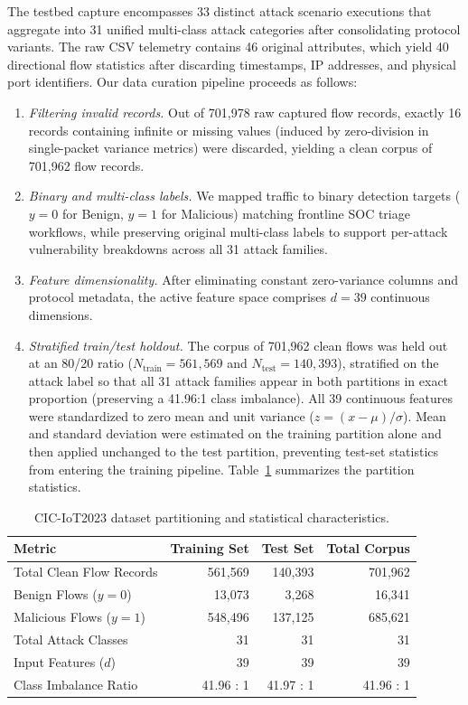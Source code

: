 \documentclass[iicol,pdflatex,sn-mathphys-num]{sn-jnl}
\begin{document}
The testbed capture encompasses 33 distinct attack scenario executions that aggregate into 31 unified multi-class attack categories after consolidating protocol variants. The raw CSV telemetry contains 46 original attributes, which yield 40 directional flow statistics after discarding timestamps, IP addresses, and physical port identifiers. Our data curation pipeline proceeds as follows:
\begin{enumerate}
    \item \textit{Filtering invalid records.} Out of 701,978 raw captured flow records, exactly 16 records containing infinite or missing values (induced by zero-division in single-packet variance metrics) were discarded, yielding a clean corpus of 701,962 flow records.
    \item \textit{Binary and multi-class labels.} We mapped traffic to binary detection targets ($y=0$ for Benign, $y=1$ for Malicious) matching frontline SOC triage workflows, while preserving original multi-class labels to support per-attack vulnerability breakdowns across all 31 attack families.
    \item \textit{Feature dimensionality.} After eliminating constant zero-variance columns and protocol metadata, the active feature space comprises $d=39$ continuous dimensions.
    \item \textit{Stratified train/test holdout.} The corpus of 701,962 clean flows was held out at an 80/20 ratio ($N_{\text{train}} = 561,569$ and $N_{\text{test}} = 140,393$), stratified on the attack label so that all 31 attack families appear in both partitions in exact proportion (preserving a 41.96:1 class imbalance). All 39 continuous features were standardized to zero mean and unit variance ($z = (x - \mu)/\sigma$). Mean and standard deviation were estimated on the training partition alone and then applied unchanged to the test partition, preventing test-set statistics from entering the training pipeline. Table~\ref{tab:dataset_stats} summarizes the partition statistics.
\end{enumerate}

\begin{table}[t]
\centering
\small
\caption{CIC-IoT2023 dataset partitioning and statistical characteristics.}
\label{tab:dataset_stats}
\begin{tabular*}{\textwidth}{@{\extracolsep{\fill}}lrrr}
\toprule
\textbf{Metric} & \textbf{Training Set} & \textbf{Test Set} & \textbf{Total Corpus} \\
\midrule
Total Clean Flow Records & 561,569 & 140,393 & 701,962 \\
Benign Flows ($y=0$) & 13,073 & 3,268 & 16,341 \\
Malicious Flows ($y=1$) & 548,496 & 137,125 & 685,621 \\
Total Attack Classes & 31 & 31 & 31 \\
Input Features ($d$) & 39 & 39 & 39 \\
Class Imbalance Ratio & 41.96 : 1 & 41.97 : 1 & 41.96 : 1 \\
\bottomrule
\end{tabular*}
\end{table}
\end{document}
